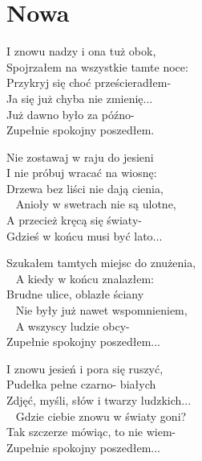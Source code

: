 \section{Nowa}
\begin{text}
I znowu nadzy i ona tuż obok, \\
Spojrzałem na wszystkie tamte noce:\\
Przykryj się choć prześcieradłem-\\
Ja się już chyba nie zmienię...\\
Już dawno było za późno-\\
Zupełnie spokojny poszedłem. 

\vin Nie zostawaj w raju do jesieni\\
\vin I nie próbuj wracać na wiosnę:\\
\vin Drzewa bez liści nie dają cienia,\\ 
\vin Anioły w swetrach nie są ulotne,\\
\vin A przecież kręcą się światy-\\
\vin Gdzieś w końcu musi być lato... 

Szukałem tamtych miejsc do znużenia,\\ 
A kiedy w końcu znalazłem:\\
Brudne ulice, oblazłe ściany\\ 
Nie były już nawet wspomnieniem,\\ 
A wszyscy ludzie obcy-\\
Zupełnie spokojny poszedłem... 

I znowu jesień i pora się ruszyć,\\
Pudełka pełne czarno- białych\\
Zdjęć, myśli, słów i twarzy ludzkich...\\ 
Gdzie ciebie znowu w światy goni?\\
Tak szczerze mówiąc, to nie wiem-\\
Zupełnie spokojny poszedłem... 
\end{text}